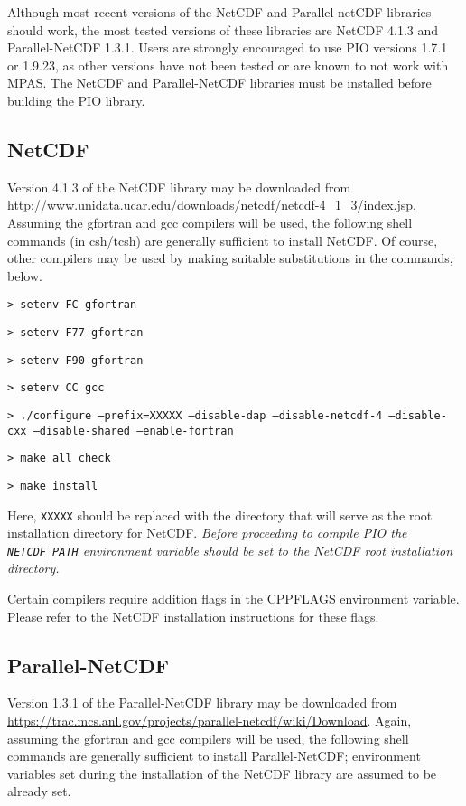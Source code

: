 Although most recent versions of the NetCDF and Parallel-netCDF libraries should work,
the most tested versions of these libraries are NetCDF 4.1.3 and Parallel-NetCDF 1.3.1.
Users are strongly encouraged to use PIO versions 1.7.1 or 1.9.23, as other versions
have not been tested or are known to not work with MPAS. The NetCDF and Parallel-NetCDF
libraries must be installed before building the PIO library.

\subsection{NetCDF}
\label{serial_netcdf}

Version 4.1.3 of the NetCDF library may be downloaded from
\url{http://www.unidata.ucar.edu/downloads/netcdf/netcdf-4\_1\_3/index.jsp}.
Assuming the gfortran and gcc compilers will be used, the following shell
commands (in csh/tcsh) are generally sufficient to install NetCDF. Of course, other compilers
may be used by making suitable substitutions in the commands, below.

\vspace{12pt}
{\tt > setenv FC gfortran}

{\tt > setenv F77 gfortran} 

{\tt > setenv F90 gfortran}

{\tt > setenv CC gcc} 

{\tt > ./configure --prefix=XXXXX --disable-dap --disable-netcdf-4 --disable-cxx \hfill\break --disable-shared --enable-fortran} 

{\tt > make all check}

{\tt > make install}
\vspace{12pt}

Here, {\tt XXXXX} should be replaced with the directory that will serve as the
root installation directory for NetCDF.  {\em Before proceeding to compile PIO
the {\tt NETCDF\_PATH} environment variable should be set to the NetCDF root
installation directory.}

Certain compilers require addition flags in the CPPFLAGS environment variable.
Please refer to the NetCDF installation instructions for these flags.

\subsection{Parallel-NetCDF}
\label{parallel_netcdf}

Version 1.3.1 of the Parallel-NetCDF library may be downloaded from
\url{https://trac.mcs.anl.gov/projects/parallel-netcdf/wiki/Download}. Again, assuming
the gfortran and gcc compilers will be used, the following shell commands are
generally sufficient to install Parallel-NetCDF; environment variables set during the
installation of the NetCDF library are assumed to be already set.

